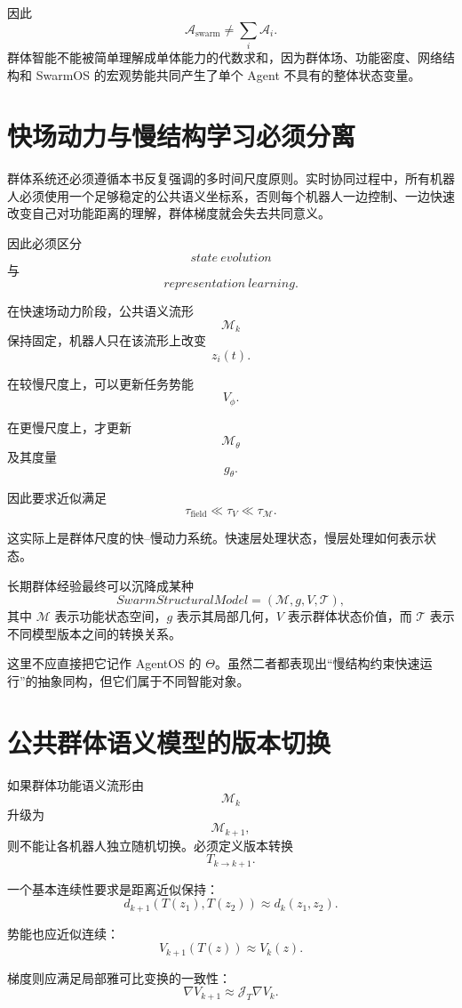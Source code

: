 因此
\[
\mathcal A_{\mathrm{swarm}}
\neq
\sum_i\mathcal A_i.
\]
群体智能不能被简单理解成单体能力的代数求和，因为群体场、功能密度、网络结构和 SwarmOS 的宏观势能共同产生了单个 Agent 不具有的整体状态变量。


\section{快场动力与慢结构学习必须分离}

群体系统还必须遵循本书反复强调的多时间尺度原则。实时协同过程中，所有机器人必须使用一个足够稳定的公共语义坐标系，否则每个机器人一边控制、一边快速改变自己对功能距离的理解，群体梯度就会失去共同意义。

因此必须区分
\[
state\ evolution
\]
与
\[
representation\ learning.
\]

在快速场动力阶段，公共语义流形
\[
\mathcal M_k
\]
保持固定，机器人只在该流形上改变
\[
z_i(t).
\]

在较慢尺度上，可以更新任务势能
\[
V_\phi.
\]

在更慢尺度上，才更新
\[
\mathcal M_\theta
\]
及其度量
\[
g_\theta.
\]

因此要求近似满足
\[
\boxed{
\tau_{\mathrm{field}}
\ll
\tau_V
\ll
\tau_{\mathcal M}.
}
\]

这实际上是群体尺度的快--慢动力系统。快速层处理状态，慢层处理如何表示状态。

长期群体经验最终可以沉降成某种
\[
SwarmStructuralModel
=
(
\mathcal M,
g,
V,
\mathcal T
),
\]
其中 $\mathcal M$ 表示功能状态空间，$g$ 表示其局部几何，$V$ 表示群体状态价值，而 $\mathcal T$ 表示不同模型版本之间的转换关系。

这里不应直接把它记作 AgentOS 的 $\Theta$。虽然二者都表现出“慢结构约束快速运行”的抽象同构，但它们属于不同智能对象。


\section{公共群体语义模型的版本切换}

如果群体功能语义流形由
\[
\mathcal M_k
\]
升级为
\[
\mathcal M_{k+1},
\]
则不能让各机器人独立随机切换。必须定义版本转换
\[
T_{k\rightarrow k+1}.
\]

一个基本连续性要求是距离近似保持：
\[
d_{k+1}
(
T(z_1),
T(z_2)
)
\approx
d_k(z_1,z_2).
\]

势能也应近似连续：
\[
V_{k+1}(T(z))
\approx
V_k(z).
\]

梯度则应满足局部雅可比变换的一致性：
\[
\nabla V_{k+1}
\approx
\mathcal J_T
\nabla V_k.
\]

